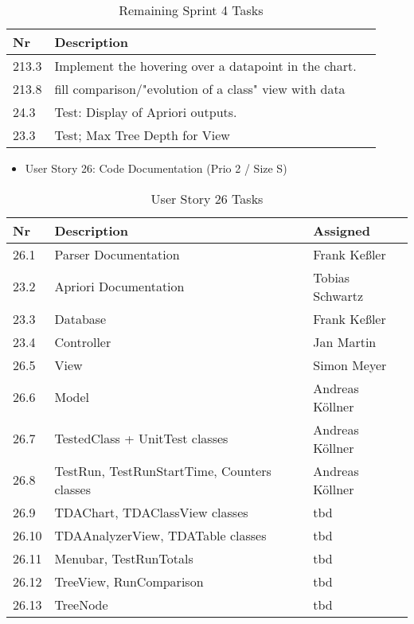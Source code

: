 \begin{table}[h]
  \caption{Remaining Sprint 4 Tasks}
  \label{Remaing Tasks}
  \centering
  \begin{tabular}{p{1cm}|p{5cm}|p{3cm}|}
  	Nr & Description  \\ 
  	\hline
  	213.3 & Implement the hovering over a datapoint in the chart. \\ 
  	\hline
  	213.8 & fill comparison/"evolution of a class" view with data \\ 
  	\hline
  	24.3 & Test: Display of Apriori outputs. \\ 
  	\hline
  	23.3 & Test; Max Tree Depth for View \\ 
  	\hline
  \end{tabular}
\end{table}
\begin{itemize}
	\item User Story 26: Code Documentation (Prio 2 / Size S)
	\end{itemize}
\begin{table}[htbp!]
  \caption{User Story 26 Tasks}
  \label{Story 26 Tasks}
  \centering
  \begin{tabular}{p{1cm}|p{5cm}|p{3cm}|}
  	Nr & Description & Assigned \\ 
  	\hline
  	26.1 & Parser Documentation & Frank Keßler \\ 
  	\hline
  	23.2 & Apriori Documentation & Tobias Schwartz \\ 
  	\hline
  	23.3 & Database & Frank Keßler \\ 
  	\hline
  	23.4 & Controller &  Jan Martin \\ 
  	\hline
  	26.5 & View & Simon Meyer \\ 
  	\hline
  	26.6 & Model & Andreas Köllner \\ 
  	\hline
  	26.7 & TestedClass + UnitTest classes & Andreas Köllner \\ 
  	\hline
  	26.8 & TestRun, TestRunStartTime, Counters classes & Andreas Köllner \\ 
  	\hline
  	26.9 & TDAChart, TDAClassView classes & tbd \\ 
  	\hline
  	26.10 & TDAAnalyzerView, TDATable classes & tbd \\ 
  	\hline
  	26.11 & Menubar, TestRunTotals & tbd \\ 
  	\hline
  	26.12 & TreeView, RunComparison & tbd \\ 
  	\hline
  	26.13 & TreeNode & tbd \\ 
  	\hline
  \end{tabular}
\end{table}

